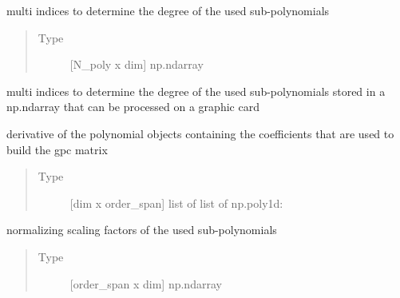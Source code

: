 \documentclass[letterpaper,10pt,english,openany,oneside]{sphinxmanual}
\begin{document}
\begin{fulllineitems}

\begin{fulllineitems}
\label{\detokenize{pygpc:pygpc.gpc.gPC.poly_idx}}
multi indices to determine the degree of the used sub-polynomials
\begin{quote}\begin{description}
\item[{Type}] \leavevmode
{[}N\_poly x dim{]} np.ndarray

\end{description}\end{quote}

\end{fulllineitems}



\begin{fulllineitems}
multi indices to determine the degree of the used sub-polynomials stored in a np.ndarray that can be processed
on a graphic card

\end{fulllineitems}


\begin{fulllineitems}
\label{\detokenize{pygpc:pygpc.gpc.gPC.poly_der}}
derivative of the polynomial objects containing the coefficients that are used to build the gpc matrix
\begin{quote}\begin{description}
\item[{Type}] \leavevmode
{[}dim x order\_span{]} list of list of np.poly1d:

\end{description}\end{quote}

\end{fulllineitems}


\begin{fulllineitems}
\label{\detokenize{pygpc:pygpc.gpc.gPC.poly_norm}}
normalizing scaling factors of the used sub-polynomials
\begin{quote}\begin{description}
\item[{Type}] \leavevmode
{[}order\_span x dim{]} np.ndarray


\end{description}
\end{quote}
\end{fulllineitems}
\end{fulllineitems}
\end{document}
